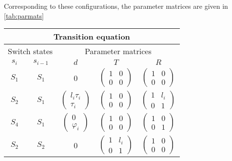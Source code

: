 \documentclass[12pt]{article}
\begin{document}
Corresponding to these configurations, the parameter
matrices are given in \autoref{tab:parmats}
\begin{table}[h!]
\centering
\begin{tabular}[h!]{cc|ccc}
  \hline\hline
  \multicolumn{5}{c}{Transition equation}\\
  \hline
  \multicolumn{2}{c|}{Switch states} & \multicolumn{3}{c}{Parameter
                                      matrices}\\
  $s_i$ & $s_{i-1}$ & $d$ & $T$ & $R$ \\
  \hline
  $S_1$ &  $S_1$ & 0 & $\begin{pmatrix}1&0\\0&0\end{pmatrix}$ 
                 & $\begin{pmatrix}1&0\\0&0\end{pmatrix}$\\
  $S_2$ & $S_1$ & $\begin{pmatrix} l_i\tau_i\\ \tau_i\end{pmatrix}$ 
                                    & $\begin{pmatrix} 1 & 0 \\ 0 &
                                      0 \end{pmatrix}$ 
          & $\begin{pmatrix} 1 & l_i\\ 0 & 1 \end{pmatrix}$\\
  $S_4$ & $S_1$ & $\begin{pmatrix}0\\\varphi_i\end{pmatrix}$ 
                                     & $\begin{pmatrix}1&0\\0&0\end{pmatrix}$
          & $\begin{pmatrix}1&0\\0&1\end{pmatrix}$\\
  $S_2$ & $S_2$ & 0 & $\begin{pmatrix} 1 & l_i \\ 0 & 1 \end{pmatrix}$ 
        & $\begin{pmatrix}1&0\\0&0\end{pmatrix}$\\

\end{tabular}
\end{table}
\end{document}
